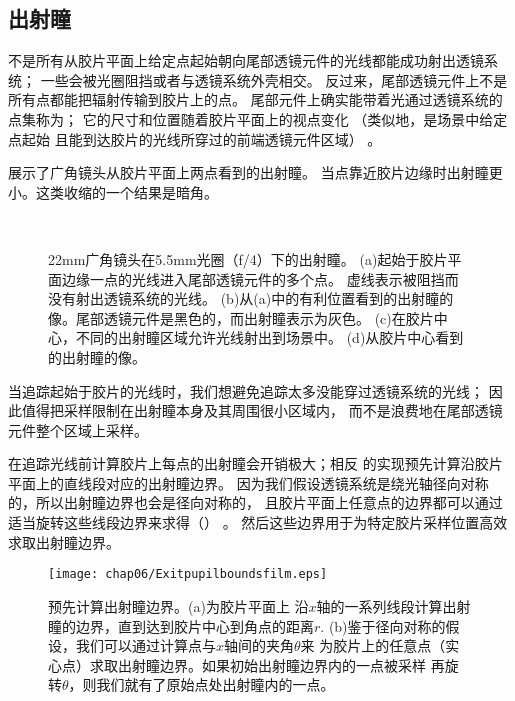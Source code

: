 \subsection{出射瞳}\label{sub:出射瞳}
不是所有从胶片平面上给定点起始朝向尾部透镜元件的光线都能成功射出透镜系统；
一些会被光圈阻挡或者与透镜系统外壳相交。
反过来，尾部透镜元件上不是所有点都能把辐射传输到胶片上的点。
尾部元件上确实能带着光通过透镜系统的点集称为；
它的尺寸和位置随着胶片平面上的视点变化
（类似地，是场景中给定点起始
且能到达胶片的光线所穿过的前端透镜元件区域）
。

展示了广角镜头从胶片平面上两点看到的出射瞳。
当点靠近胶片边缘时出射瞳更小。这类收缩的一个结果是暗角。
\begin{figure}[htbp]
    \centering
    \qquad
    \\
    \qquad
    \caption{22mm广角镜头在5.5mm光圈（f/4）下的出射瞳。
        (a)起始于胶片平面边缘一点的光线进入尾部透镜元件的多个点。
        虚线表示被阻挡而没有射出透镜系统的光线。
        (b)从(a)中的有利位置看到的出射瞳的像。尾部透镜元件是黑色的，而出射瞳表示为灰色。
        (c)在胶片中心，不同的出射瞳区域允许光线射出到场景中。
        (d)从胶片中心看到的出射瞳的像。}
    \label{fig:6.21}
\end{figure}

当追踪起始于胶片的光线时，我们想避免追踪太多没能穿过透镜系统的光线；
因此值得把采样限制在出射瞳本身及其周围很小区域内，
而不是浪费地在尾部透镜元件整个区域上采样。

在追踪光线前计算胶片上每点的出射瞳会开销极大；相反
的实现预先计算沿胶片平面上的直线段对应的出射瞳边界。
因为我们假设透镜系统是绕光轴径向对称的，所以出射瞳边界也会是径向对称的，
且胶片平面上任意点的边界都可以通过适当旋转这些线段边界来求得（）
。
然后这些边界用于为特定胶片采样位置高效求取出射瞳边界。
\begin{figure}[htbp]
    \centering\texttt{[image: chap06/Exitpupilboundsfilm.eps]}
    \caption{预先计算出射瞳边界。(a)为胶片平面上
        沿$x$轴的一系列线段计算出射瞳的边界，直到达到胶片中心到角点的距离$r$.
        (b)鉴于径向对称的假设，我们可以通过计算点与$x$轴间的夹角$\theta$来
        为胶片上的任意点（实心点）求取出射瞳边界。如果初始出射瞳边界内的一点被采样
        再旋转$\theta$，则我们就有了原始点处出射瞳内的一点。}
    \label{fig:6.22}
\end{figure}

